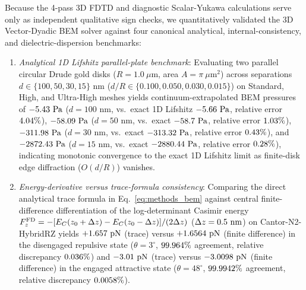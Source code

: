\documentclass[pdflatex,sn-nature]{sn-jnl}
\DeclareRobustCommand{\roundtwo}[1]{\fpeval{round(#1,2)}}
\DeclareRobustCommand{\roundthree}[1]{\fpeval{round(#1,3)}}
\DeclareRobustCommand{\roundfour}[1]{\fpeval{round(#1,4)}}
\begin{document}
Because the 4-pass 3D FDTD and diagnostic Scalar-Yukawa calculations serve only as independent qualitative sign checks, we quantitatively validated the 3D Vector-Dyadic BEM solver against four canonical analytical, internal-consistency, and dielectric-dispersion benchmarks:
\begin{enumerate}
    \item \emph{Analytical 1D Lifshitz parallel-plate benchmark}: Evaluating two parallel circular Drude gold disks ($R = 1.0\ \mu\text{m}$, area $A = \pi\ \mu\text{m}^2$) across separations $d \in \{100, 50, 30, 15\}\text{ nm}$ ($d/R \in \{0.100, 0.050, 0.030, 0.015\}$) on Standard, High, and Ultra-High meshes yields continuum-extrapolated BEM pressures of $\roundtwo{\BemValPlateBemContinuumDonezerozeronmPa}\text{ Pa}$ ($d=100\text{ nm}$, vs.\ exact 1D Lifshitz $\roundtwo{\BemValLifshitzExactDonezerozeronmPa}\text{ Pa}$, relative error $\roundtwo{\BemValPlateRelErrContinuumDonezerozeronmPct}\%$), $\roundtwo{\BemValPlateBemContinuumDfivezeronmPa}\text{ Pa}$ ($d=50\text{ nm}$, vs.\ exact $\roundtwo{\BemValLifshitzExactDfivezeronmPa}\text{ Pa}$, relative error $\roundtwo{\BemValPlateRelErrContinuumDfivezeronmPct}\%$), $\roundtwo{\BemValPlateBemContinuumDthreezeronmPa}\text{ Pa}$ ($d=30\text{ nm}$, vs.\ exact $\roundtwo{\BemValLifshitzExactDthreezeronmPa}\text{ Pa}$, relative error $\roundtwo{\BemValPlateRelErrContinuumDthreezeronmPct}\%$), and $\roundtwo{\BemValPlateBemContinuumDonefivenmPa}\text{ Pa}$ ($d=15\text{ nm}$, vs.\ exact $\roundtwo{\BemValLifshitzExactDonefivenmPa}\text{ Pa}$, relative error $\roundtwo{\BemValPlateRelErrContinuumDonefivenmPct}\%$), indicating monotonic convergence to the exact 1D Lifshitz limit as finite-disk edge diffraction ($O(d/R)$) vanishes.
    \item \emph{Energy-derivative versus trace-formula consistency}: Comparing the direct analytical trace formula in Eq.~\eqref{eq:methods_bem} against central finite-difference differentiation of the log-determinant Casimir energy $F_z^{\rm FD} = -[E_C(z_0 + \Delta z) - E_C(z_0 - \Delta z)]/(2\Delta z)$ ($\Delta z = 0.5{}\text{ nm}$) on Cantor-N2-HybridRZ yields $+\roundfour{\BemValCantorThetathreeTraceFzPn}\text{ pN}$ (trace) versus $+\roundfour{\BemValCantorThetathreeFdFzPn}\text{ pN}$ (finite difference) in the disengaged repulsive state ($\theta=3^\circ$, $\roundthree{\BemValCantorThetathreeTraceVsFdAgreementPct}\%$ agreement, relative discrepancy $\roundthree{\BemValCantorThetathreeTraceVsFdRelErrPct}\%$) and $\roundfour{\BemValCantorThetafoureightTraceFzPn}\text{ pN}$ (trace) versus $\roundfour{\BemValCantorThetafoureightFdFzPn}\text{ pN}$ (finite difference) in the engaged attractive state ($\theta=48^\circ$, $\roundfour{\BemValCantorThetafoureightTraceVsFdAgreementPct}\%$ agreement, relative discrepancy $\roundfour{\BemValCantorThetafoureightTraceVsFdRelErrPct}\%$).

\end{enumerate}
\end{document}
